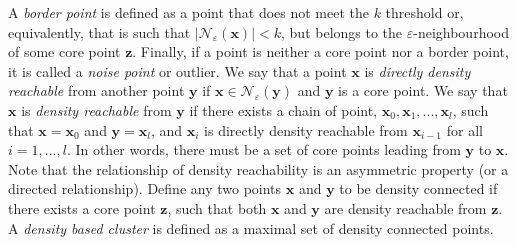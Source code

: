 \documentclass[a4paper]{article}
\begin{document}
	A \textit{border point} is defined as a point that does not meet the $k$ threshold or, equivalently, that is such that $|\mathcal{N}_{\varepsilon}(\boldsymbol{x})| < k$, but belongs to the $\varepsilon$-neighbourhood of some core point $\boldsymbol{z}$.
	Finally, if a point is neither a core point nor a border point, it is called a \textit{noise point} or outlier.
	We say that a point $\boldsymbol{x}$ is \textit{directly density reachable} from another point $\boldsymbol{y}$ if $\boldsymbol{x} \in \mathcal{N}_{\varepsilon} \left( \boldsymbol{y} \right)$ and $\boldsymbol{y}$ is a core point.
	We say that $\boldsymbol{x}$ is \textit{density reachable} from $\boldsymbol{y}$ if there exists a chain of point, $\boldsymbol{x}_{0}, \boldsymbol{x}_{1}, ..., \boldsymbol{x}_{l}$, such that $\boldsymbol{x}=\boldsymbol{x}_{0}$ and $\boldsymbol{y} = \boldsymbol{x}_{l}$, and $\boldsymbol{x}_{i}$ is directly density reachable from $\boldsymbol{x}_{i-1}$ for all $i=1,...,l$.
	In other words, there must be a set of core points leading from $\boldsymbol{y}$ to $\boldsymbol{x}$. Note that the relationship of density reachability is an asymmetric property (or a directed relationship).
	Define any two points $\boldsymbol{x}$ and $\boldsymbol{y}$ to be density connected if there exists a core point $\boldsymbol{z}$, such that both $\boldsymbol{x}$ and $\boldsymbol{y}$ are density reachable from $\boldsymbol{z}$.
	A \textit{density based cluster} is defined as a maximal set of density connected points.
	
\end{document}
